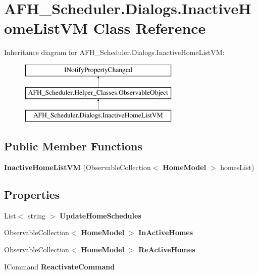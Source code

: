\section{A\+F\+H\+\_\+\+Scheduler.\+Dialogs.\+Inactive\+Home\+List\+VM Class Reference}
\label{class_a_f_h___scheduler_1_1_dialogs_1_1_inactive_home_list_v_m}
Inheritance diagram for A\+F\+H\+\_\+\+Scheduler.\+Dialogs.\+Inactive\+Home\+List\+VM\+:\begin{figure}[H]
\begin{center}
\leavevmode
\includegraphics[height=3.000000cm]{class_a_f_h___scheduler_1_1_dialogs_1_1_inactive_home_list_v_m}
\end{center}
\end{figure}
\subsection*{Public Member Functions}
\begin{DoxyCompactItemize}
\item 
\mbox{\label{class_a_f_h___scheduler_1_1_dialogs_1_1_inactive_home_list_v_m_a6b8da1c902cb7f135314436b427563a7}} 
{\bfseries Inactive\+Home\+List\+VM} (Observable\+Collection$<$ \textbf{ Home\+Model} $>$ homes\+List)
\end{DoxyCompactItemize}
\subsection*{Properties}
\begin{DoxyCompactItemize}
\item 
\mbox{\label{class_a_f_h___scheduler_1_1_dialogs_1_1_inactive_home_list_v_m_aeae85a0a0f0e749600ccccb6a5201e90}} 
List$<$ string $>$ {\bfseries Update\+Home\+Schedules}\hspace{0.3cm}{\ttfamily  [get, set]}
\item 
\mbox{\label{class_a_f_h___scheduler_1_1_dialogs_1_1_inactive_home_list_v_m_a73c3bfb2a6dd53a22ee21de2e1086bf6}} 
Observable\+Collection$<$ \textbf{ Home\+Model} $>$ {\bfseries In\+Active\+Homes}\hspace{0.3cm}{\ttfamily  [get, set]}
\item 
\mbox{\label{class_a_f_h___scheduler_1_1_dialogs_1_1_inactive_home_list_v_m_a051f7da74bb6b28f500087ff57195718}} 
Observable\+Collection$<$ \textbf{ Home\+Model} $>$ {\bfseries Re\+Active\+Homes}\hspace{0.3cm}{\ttfamily  [get, set]}
\item 
\mbox{\label{class_a_f_h___scheduler_1_1_dialogs_1_1_inactive_home_list_v_m_a1e8844eaceabd2dd0a56fd1e141fba1d}} 
I\+Command {\bfseries Reactivate\+Command}\hspace{0.3cm}{\ttfamily  [get]}
\end{DoxyCompactItemize}
